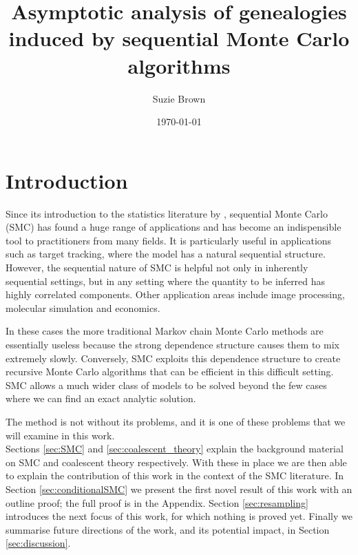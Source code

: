 \documentclass[fleqn]{article}
\title{Asymptotic analysis of genealogies induced by sequential Monte Carlo algorithms}
\author{Suzie Brown}
\date{\today}
\theoremstyle{definition}
\begin{document}
\maketitle
\thispagestyle{fancy}

\section{Introduction}
Since its introduction to the statistics literature by \citet{gordon1993}, sequential Monte Carlo (SMC) has found a huge range of applications and has become an indispensible tool to practitioners from many fields. 
It is particularly useful in applications such as target tracking, where the model has a natural sequential structure.
However, the sequential nature of SMC is helpful not only in inherently sequential settings, but in any setting where the quantity to be inferred has highly correlated components.
Other application areas include image processing, molecular simulation and economics.

In these cases the more traditional Markov chain Monte Carlo methods are essentially useless because the strong dependence structure causes them to mix extremely slowly.
Conversely, SMC exploits this dependence structure to create recursive Monte Carlo algorithms that can be efficient in this difficult setting.
SMC allows a much wider class of models to be solved beyond the few cases where we can find an exact analytic solution.

The method is not without its problems, and it is one of these problems that we will examine in this work.\\

Sections \ref{sec:SMC} and \ref{sec:coalescent_theory} explain the background material on SMC and coalescent theory respectively. With these in place we are then able to explain the contribution of this work in the context of the SMC literature.
In Section \ref{sec:conditionalSMC} we present the first novel result of this work with an outline proof; the full proof is in the Appendix.
Section \ref{sec:resampling} introduces the next focus of this work, for which nothing is proved yet.
Finally we summarise future directions of the work, and its potential impact, in Section \ref{sec:discussion}.\\
\end{document}
